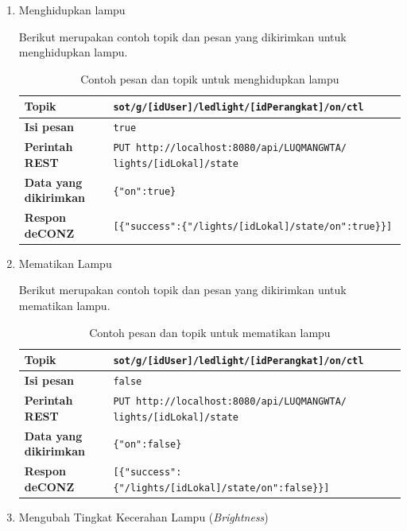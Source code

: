 \begin{enumerate}
	\item Menghidupkan lampu
	
	Berikut merupakan contoh topik dan pesan yang dikirimkan untuk menghidupkan lampu.
	
	\begin{table}
		\centering
		\caption{Contoh pesan dan topik untuk menghidupkan lampu}
		\label{tab:nyalainLampu}
		\begin{tabular}{|l |p{11cm} |}
			\hline
			\textbf{Topik} & \texttt{sot/g/[idUser]/ledlight/[idPerangkat]/on/ctl} \\
			\hline
			\textbf{Isi pesan} & \texttt{true} \\
			\hline
			\textbf{Perintah REST }& \texttt{PUT http://localhost:8080/api/LUQMANGWTA/ lights/[idLokal]/state}\\
			\hline
			\textbf{Data yang dikirimkan} & \texttt{\{"on":true\}} \\
			\hline
			\textbf{Respon deCONZ} & \texttt{[\{"success":\{"/lights/[idLokal]/state/on":true\}\}]} \\
			\hline
		\end{tabular}
	\end{table}
	
	
	\item Mematikan Lampu
	
	Berikut merupakan contoh topik dan pesan yang dikirimkan untuk mematikan lampu.
	
	\begin{table}
		\centering
		\caption{Contoh pesan dan topik untuk mematikan lampu}
		\label{tab:matiinLampu}
		\begin{tabular}{| l | p{11cm} |}
			\hline
			\textbf{Topik} & \texttt{sot/g/[idUser]/ledlight/[idPerangkat]/on/ctl} \\
			\hline
			\textbf{Isi pesan} & \texttt{false} \\
			\hline
			\textbf{Perintah REST} & \texttt{PUT http://localhost:8080/api/LUQMANGWTA/ lights/[idLokal]/state} \\
			\hline
			\textbf{Data yang dikirimkan} & \texttt{\{"on":false\}} \\
			\hline
			\textbf{Respon deCONZ} & \texttt{[\{"success":\{"/lights/[idLokal]/state/on":false\}\}]} \\
			\hline
		\end{tabular}
	\end{table}
	
	\item Mengubah Tingkat Kecerahan Lampu (\textit{Brightness})
	

\end{enumerate}
